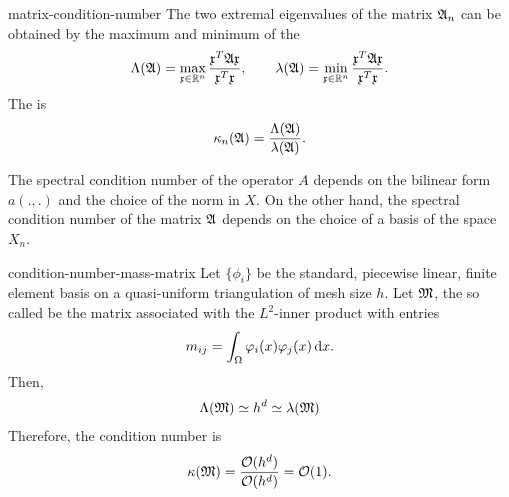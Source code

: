 \begin{Definition}{matrix-condition-number}
  The two extremal eigenvalues of the matrix $\mathfrak{A}_n$ can be
  obtained by the maximum and minimum of the 
  \begin{gather}
    \label{eq:itintro:3}
    \Lambda(\mathfrak{A}) = \max_{\mathfrak{x}\in \mathbb R^n}\frac{\mathfrak{x}^T \mathfrak{A} \mathfrak{x}}{\mathfrak{x}^T\mathfrak{x}},
    \qquad
    \lambda(\mathfrak{A}) = \min_{\mathfrak{x}\in \mathbb R^n}\frac{\mathfrak{x}^T \mathfrak{A} \mathfrak{x}}{\mathfrak{x}^T\mathfrak{x}}.
  \end{gather}
  The  is
  \begin{gather*}
    \kappa_n(\mathfrak{A}) = \frac{\Lambda(\mathfrak{A})}{\lambda(\mathfrak{A})}.
  \end{gather*}
\end{Definition}

\begin{remark}
  The spectral condition number of the operator $A$ depends on the
  bilinear form $a(.,.)$ and the choice of the norm in $X$. On the
  other hand, the spectral condition number of the matrix $\mathfrak{A}$
  depends on the choice of a basis of the space $X_n$.
\end{remark}

\begin{Lemma}{condition-number-mass-matrix}
  \label{lemma:itintro:1}
  Let $\{\phi_i\}$ be the standard, piecewise linear, finite element
  basis on a quasi-uniform triangulation of mesh size $h$. Let $\mathfrak{M}$, the so called  be the matrix associated with
  the $L^2$-inner product with entries
  \begin{gather*}
    m_{ij} = \int_\Omega \varphi_i(x) \varphi_j(x) \,\mathrm{d} x.
  \end{gather*}
  Then,
  \begin{gather*}
    \Lambda(\mathfrak{M}) \simeq h^{d} \simeq  \lambda(\mathfrak{M})
  \end{gather*}
  Therefore, the condition number is
  \begin{gather*}
    \kappa(\mathfrak{M}) = \frac{\mathcal O(h^{d})}{\mathcal O(h^{d})} = {\mathcal O(1)}.
  \end{gather*}
\end{Lemma}

